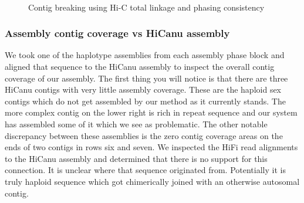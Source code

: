 {\begin{figure}[htbp!]
\caption{Contig breaking using Hi-C total linkage and phasing consistency}
\label{figure:assemblyplot}
\begin{centering}
 \\
\par{}
\end{centering}
\end{figure}

\subsubsection{Assembly contig coverage vs HiCanu assembly}

\par{
We took one of the haplotype assemblies from each assembly phase block and aligned that sequence to the HiCanu assembly to inspect the overall contig coverage of our assembly. The first thing you will notice is that there are three HiCanu contigs with very little assembly coverage. These are the haploid sex contigs which do not get assembled by our method as it currently stands. The more complex contig on the lower right is rich in repeat sequence and our system has assembled some of it which we see as problematic. The other notable discrepancy between these assemblies is the zero contig coverage areas on the ends of two contigs in rows six and seven. We inspected the HiFi read alignments to the HiCanu assembly and determined that there is no support for this connection. It is unclear where that sequence originated from. Potentially it is truly haploid sequence which got chimerically joined with an otherwise autosomal contig.
}

}
